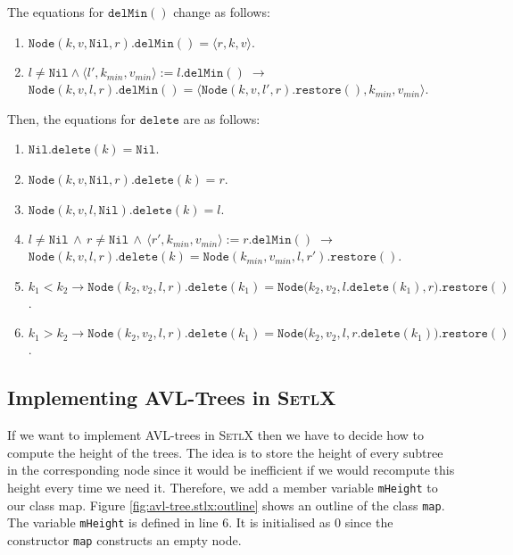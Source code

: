 The equations for  $\mathtt{delMin}()$ change as follows:
\begin{enumerate}
\item $\mathtt{Node}(k, v, \mathtt{Nil}, r).\mathtt{delMin}() = \langle r, k, v \rangle$.
\item $l\not= \mathtt{Nil} \wedge \langle l',k_{min}, v_{min}\rangle := l.\mathtt{delMin}() 
       \;\rightarrow$ \\[0.2cm]
       \hspace*{1.3cm} 
       $\mathtt{Node}(k, v, l, r).\mathtt{delMin}() = 
        \langle \mathtt{Node}(k, v, l', r).\mathtt{restore}(), k_{min}, v_{min} \rangle$.
\end{enumerate}
Then, the equations for $\mathtt{delete}$ are as follows:
\begin{enumerate}
\item $\mathtt{Nil}.\mathtt{delete}(k) = \mathtt{Nil}$.
\item $\mathtt{Node}(k,v,\mathtt{Nil},r).\mathtt{delete}(k) = r$.
\item $\mathtt{Node}(k,v,l,\mathtt{Nil}).\mathtt{delete}(k) = l$.
\item $l \not= \mathtt{Nil} \,\wedge\, r \not= \mathtt{Nil} \,\wedge\, 
       \langle r',k_{min}, v_{min} \rangle := r.\mathtt{delMin}()  \;\rightarrow$ \\[0.2cm]
      \hspace*{1.3cm}
      $\mathtt{Node}(k,v,l,r).\mathtt{delete}(k) = \mathtt{Node}(k_{min},v_{min},l,r').\mathtt{restore}()$.
\item $k_1 < k_2 \rightarrow \mathtt{Node}(k_2,v_2,l,r).\mathtt{delete}(k_1) = 
       \mathtt{Node}\bigl(k_2,v_2,l.\mathtt{delete}(k_1),r\bigr).\mathtt{restore}()$.
\item $k_1 > k_2 \rightarrow \mathtt{Node}(k_2,v_2,l,r).\mathtt{delete}(k_1) = 
         \mathtt{Node}\bigl(k_2,v_2,l,r.\mathtt{delete}(k_1)\bigr).\mathtt{restore}()$.
\end{enumerate}


\subsection{Implementing AVL-Trees in \textsc{SetlX}}
If we want to implement AVL-trees in \textsc{SetlX} then we have to decide how to compute the height
of the trees.  The idea is to store the height of every subtree in the corresponding node since it
would be inefficient if we would recompute this height every time we need it.  Therefore, we add a
member variable \texttt{mHeight} to our class map.
Figure \ref{fig:avl-tree.stlx:outline} shows an outline of the class \texttt{map}.  The variable
\texttt{mHeight} is defined in line 6.  It is initialised as $0$ since the constructor \texttt{map}
constructs an empty node.  

